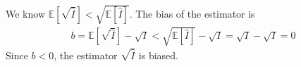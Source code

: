\begin{enumerate}[label=\alph*.]
We know $\mathbb{E}\left[\sqrt{\hat{I}}\right] < \sqrt{\mathbb{E}\left[\hat{I}\right]}$. The bias of the estimator is
\begin{align}
b = \mathbb{E}\left[\sqrt{\hat{I}}\right] - \sqrt{I} < \sqrt{\mathbb{E}\left[\hat{I}\right]} - \sqrt{I} = \sqrt{I} - \sqrt{I} = 0
\end{align}
Since $b<0$, the estimator $\sqrt{\hat{I}}$ is biased.
\end{enumerate}
